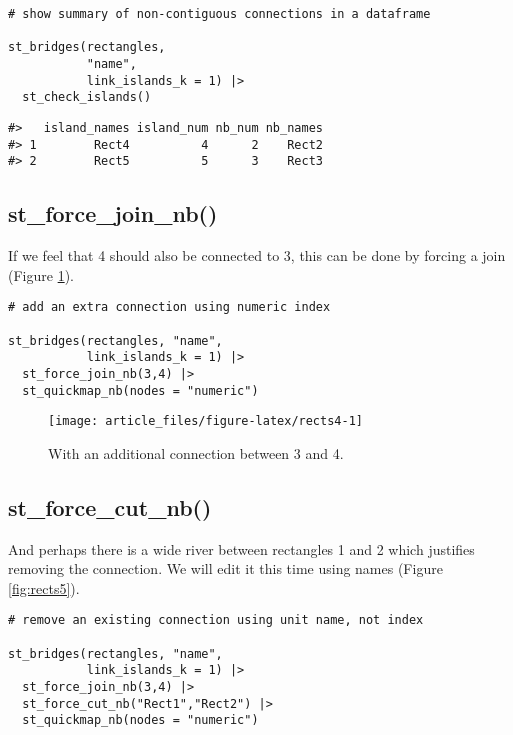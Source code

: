\begin{verbatim}
# show summary of non-contiguous connections in a dataframe

st_bridges(rectangles, 
           "name", 
           link_islands_k = 1) |> 
  st_check_islands()
\end{verbatim}

\begin{verbatim}
#>   island_names island_num nb_num nb_names
#> 1        Rect4          4      2    Rect2
#> 2        Rect5          5      3    Rect3
\end{verbatim}

\subsection{st\_force\_join\_nb()}\label{st_force_join_nb}

If we feel that 4 should also be connected to 3, this can be done
by forcing a join (Figure \ref{fig:rects4}).

\begin{verbatim}
# add an extra connection using numeric index

st_bridges(rectangles, "name", 
           link_islands_k = 1) |> 
  st_force_join_nb(3,4) |> 
  st_quickmap_nb(nodes = "numeric")
\end{verbatim}

\begin{figure}

{\centering \texttt{[image: article\_files/figure-latex/rects4-1]} 

}

\caption{With an additional connection between 3 and 4. }\label{fig:rects4}
\end{figure}

\subsection{st\_force\_cut\_nb()}\label{st_force_cut_nb}

And perhaps there is a wide river between rectangles 1 and 2 which
justifies removing the connection. We will edit it this time using
names (Figure \ref{fig:rects5}).

\begin{verbatim}
# remove an existing connection using unit name, not index

st_bridges(rectangles, "name", 
           link_islands_k = 1) |> 
  st_force_join_nb(3,4) |> 
  st_force_cut_nb("Rect1","Rect2") |> 
  st_quickmap_nb(nodes = "numeric")
\end{verbatim}


